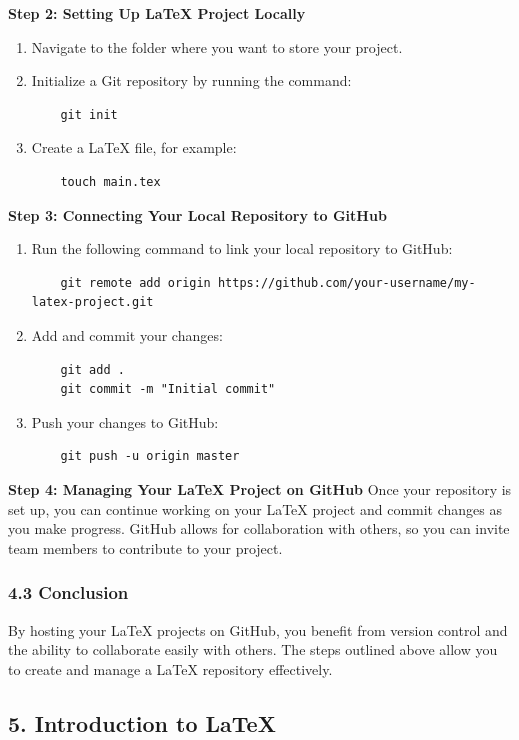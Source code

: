 \documentclass[a4paper,12pt]{article}
\begin{document}
\textbf{Step 2: Setting Up LaTeX Project Locally}
\begin{enumerate}
    \item Navigate to the folder where you want to store your project.
    \item Initialize a Git repository by running the command:
    \begin{verbatim}
    git init
    \end{verbatim}
    \item Create a LaTeX file, for example:
    \begin{verbatim}
    touch main.tex
    \end{verbatim}
\end{enumerate}

\textbf{Step 3: Connecting Your Local Repository to GitHub}
\begin{enumerate}
    \item Run the following command to link your local repository to GitHub:
    \begin{verbatim}
    git remote add origin https://github.com/your-username/my-latex-project.git
    \end{verbatim}
    \item Add and commit your changes:
    \begin{verbatim}
    git add .
    git commit -m "Initial commit"
    \end{verbatim}
    \item Push your changes to GitHub:
    \begin{verbatim}
    git push -u origin master
    \end{verbatim}
\end{enumerate}

\textbf{Step 4: Managing Your LaTeX Project on GitHub}
Once your repository is set up, you can continue working on your LaTeX project and commit changes as you make progress. GitHub allows for collaboration with others, so you can invite team members to contribute to your project.

\subsubsection*{4.3 Conclusion}
By hosting your LaTeX projects on GitHub, you benefit from version control and the ability to collaborate easily with others. The steps outlined above allow you to create and manage a LaTeX repository effectively.

\newpage
\subsection*{5. Introduction to LaTeX}
\end{document}
